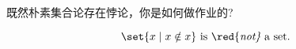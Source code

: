 \begin{frame}{}
  \begin{center}
     既然朴素集合论存在悖论，你是如何做作业的?
    \vspace{0.60cm}
  \end{center}
\end{frame}

\begin{frame}{}
  \begin{center}

    \pause
    \vspace{0.20cm}
    \begin{theorem}
      \[
        \set{x \mid x \notin x} \text{ is \red{\it not} a set.}
      \]
    \end{theorem}
  \end{center}
\end{frame}
